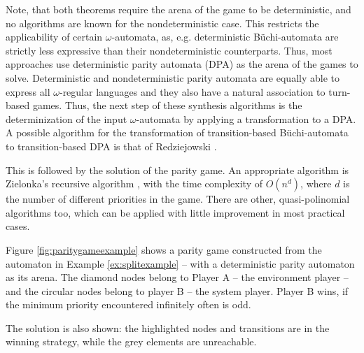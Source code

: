 Note, that both theorems require the arena of the game to be deterministic, and no algorithms are known for the nondeterministic case. This restricts the applicability of certain $\omega$-automata, as, e.g. deterministic Büchi-automata are strictly less expressive than their nondeterministic counterparts. Thus, most approaches use deterministic parity automata (DPA) as the arena of the games to solve. Deterministic and nondeterministic parity automata are equally able to express all $\omega$-regular languages and they also have a natural association to turn-based games. Thus, the next step of these synthesis algorithms is the determinization of the input $\omega$-automata by applying a transformation to a DPA. A possible algorithm for the transformation of transition-based Büchi-automata to transition-based DPA is that of Redziejowski \cite{redziejowski}.

This is followed by the solution of the parity game. An appropriate algorithm is Zielonka's recursive algorithm \cite{zielonka}, with the time complexity of $O(n^d)$, where $d$ is the number of different priorities in the game. There are other, quasi-polinomial algorithms too, which can be applied with little improvement in most practical cases.

\begin{example}
	\label{ex:paritygameexample}
	Figure \ref{fig:paritygameexample} shows a parity game constructed from the automaton in Example \ref{ex:splitexample} -- with a deterministic parity automaton as its arena. The diamond nodes belong to Player A -- the environment player -- and the circular nodes belong to player B -- the system player. Player B wins, if the minimum priority encountered infinitely often is odd. 
	
	The solution is also shown: the highlighted nodes and transitions are in the winning strategy, while the grey elements are unreachable.
\end{example}

